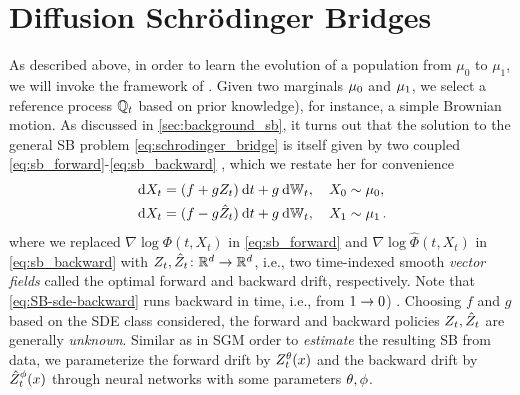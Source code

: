 \section{Diffusion Schr{\"o}dinger Bridges}
\label{sec:background_dsb}

As described above, in order to learn the evolution of a population from $\mu_0$ to $\mu_1$, we will invoke the framework of .
Given two marginals $\mu_0$ and $\mu_1$, we select a reference process $\mathbb{Q}_{ t }$ based on prior knowledge), for instance, a simple Brownian motion. As discussed in \cref{sec:background_sb}, it turns out that  the solution to the general \acrshort{SB} problem \eqref{eq:schrodinger_bridge} is itself given by two coupled  \eqref{eq:sb_forward}-\eqref{eq:sb_backward} \citep{leonard2013survey}, which we restate her for convenience
\begin{eqnarray}
\label{eq:SB-sde-forward}
\dsde &= \parens*{\tdriftbase +  \volatbase \SBfbase_\ctime} \dt + \volatbase \dWiener[\ctime],\quad \sde[0] \sim \distinit, \\ %
\label{eq:SB-sde-backward}
\dsde &= \parens{\tdriftbase -  \volatbase \SBbbase_\ctime} \dt + \volatbase \dWiener[\ctime],\quad \sde[\horizon] \sim \distend\,. %
\end{eqnarray}
where we replaced $\nabla \log \Phi\left(t, X_t\right)$ in \eqref{eq:sb_forward} and $\nabla \log \widehat{\Phi}\left(t, X_t\right)$ in \eqref{eq:sb_backward} with $Z_t, \hat{Z}_t \colon \mathbb{R}^d \to \mathbb{R}^d$, i.e., two time-indexed smooth \emph{vector fields} called the optimal forward and backward drift, respectively. Note that \eqref{eq:SB-sde-backward} runs backward in time, i.e., from $1 \to 0$) \citep{anderson1982reverse}. %
Choosing $f$ and $g$ based on the SDE class considered, the forward and backward policies $Z_t, \hat{Z}_t$ are generally \emph{unknown}.
Similar as in \acrfull{SGM} \citep{song2020score, hyvarinen2005estimation} order to \emph{estimate} the resulting \acrshort{SB} from data, we parameterize the forward drift by $\SBf$ and the backward drift by $\SBb$ through neural networks with some parameters $\theta, \phi$. \\

